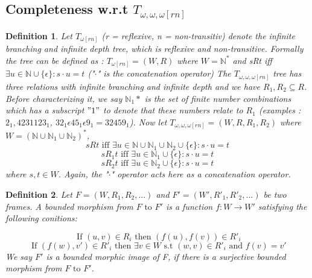 \documentclass[12pt, a4paper]{scrartcl}
\newtheorem{definition}{Definition}[subsection]
\begin{document}
\subsection{Completeness w.r.t $T_{\omega,\omega,\omega[rn]}$}

\begin{definition}
    Let $T_{\omega [rn]}$ (r = reflexive, n = non-transitiv) denote the infinite branching and infinite depth tree, which is reflexive and non-transitive.
    Formally the tree can be defined as : $T_{\omega [rn]} = (W, R)$ where $W = \mathbb{N}^*$ and sRt iff $\exists u \in \mathbb{N} \cup \{\epsilon\} : s \cdot u = t$ ("$\cdot$" is the concatenation operator) \newline \newline
    The $T_{\omega,\omega,\omega [rn]}$ tree has three relations with infinite branching and infinite depth and we have $R_1,R_2 \subseteq R$. Before characterizing it, we say
    $\mathbb{N}_{1}*$ is the set of finite number combinations which has a subscript $"1"$ to denote that these numbers relate to $R_1$  \newline 
    (examples : $2_{1}, 4231123_{1}$, $32_{1} \epsilon 45_{1} \epsilon 9_{1} = 32459_{1}$). \newline \newline
    Now let $T_{\omega,\omega,\omega [rn]} = (W, R, R_1, R_2 )$ where $W = (\mathbb{N} \cup \mathbb{N}_{1} \cup \mathbb{N}_{2})^*$, 
    $$sRt \mbox{ iff } \exists u \in \mathbb{N} \cup \mathbb{N}_{1} \cup \mathbb{N}_{2} \cup \{\epsilon\} : s \cdot u = t$$
    $$sR_1t \mbox { iff } \exists u \in \mathbb{N}_{1} \cup \{\epsilon\} : s \cdot u = t$$
    $$sR_2t \mbox { iff } \exists u \in \mathbb{N}_{2} \cup \{\epsilon\} : s \cdot u = t$$
    where $s,t \in W$. Again, the "$\cdot$" operator acts here as a concatenation operator.
        
\end{definition}

\begin{definition}
    Let $F = (W,R_1, R_2, ...)$ and $F' = (W', R'_1, R'_2, ...)$ be two frames. A bounded morphism from $F \mbox{ to } F'$ is a function
    $f : W \rightarrow W'$ satisfying the following conitions: 
    
    $$ \mbox{ If } (u,v) \in R_i  \mbox{ then }(f(u), f(v)) \in R'_i $$
    $$ \mbox{ If } (f(w), v') \in R'_i \mbox{ then } \exists v \in W \mbox{ s.t } (w,v) \in R'_i \mbox{ and } f(v) = v'$$
    We say $F'$ is a bounded morphic image of F, if there is a surjective bounded morphism from $F \mbox{ to } F'$.
        
\end{definition}
\end{document}
